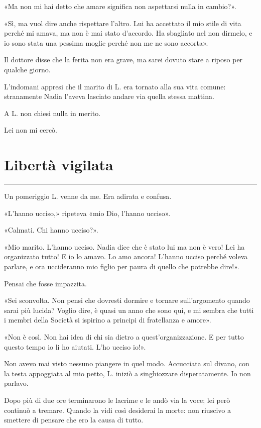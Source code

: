 \documentclass[a4paper,11pt,oneside,openright,final]{memoir}
\begin{document}
«Ma non mi hai detto che amare significa non aspettarsi nulla in cambio?».

«Sì, ma vuol dire anche rispettare l'altro. Lui ha accettato il mio stile di
vita perché mi amava, ma non è mai stato d'accordo. Ha sbagliato nel non
dirmelo, e io sono stata una pessima moglie perché non me ne sono accorta».

Il dottore disse che la ferita non era grave, ma sarei dovuto stare a riposo per
qualche giorno.

L'indomani appresi che il marito di L. era tornato alla sua vita comune:
stranamente Nadia l'aveva lasciato andare via quella stessa mattina.

A L. non chiesi nulla in merito.

Lei non mi cercò.

\chapter{Libertà vigilata}

\plainbreak{1}

Un pomeriggio L. venne da me. Era adirata e confusa.

«L'hanno ucciso,» ripeteva «mio Dio, l'hanno ucciso».

«Calmati. Chi hanno ucciso?».

«Mio marito. L'hanno ucciso. Nadia dice che è stato lui ma non è vero! Lei ha
organizzato tutto! E io lo amavo. Lo amo ancora! L'hanno ucciso perché voleva
parlare, e ora uccideranno mio figlio per paura di quello che potrebbe dire!».

Pensai che fosse impazzita.

«Sei sconvolta. Non pensi che dovresti dormire e tornare sull'argomento quando
sarai più lucida? Voglio dire, è quasi un anno che sono qui, e mi sembra che
tutti i membri della Società si ispirino a principi di fratellanza e amore».

«Non è così. Non hai idea di chi sia dietro a quest'organizzazione. E per tutto
questo tempo io li ho aiutati. L'ho ucciso io!».

Non avevo mai visto nessuno piangere in quel modo. Accucciata sul divano, con la
testa appoggiata al mio petto, L. iniziò a singhiozzare disperatamente. Io non
parlavo.

Dopo più di due ore terminarono le lacrime e le andò via la voce; lei però
continuò a tremare. Quando la vidi così desiderai la morte: non riuscivo a
smettere di pensare che ero la causa di tutto.
\end{document}
